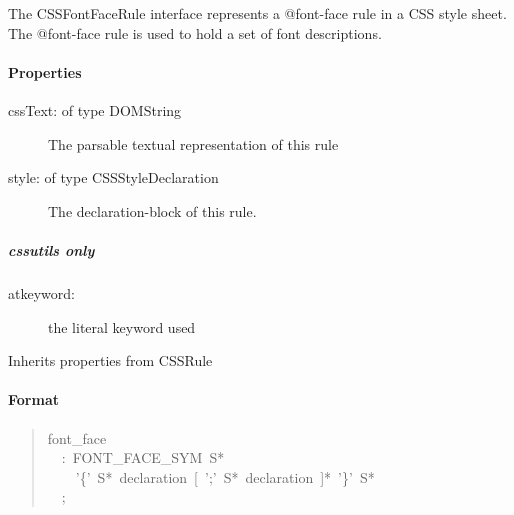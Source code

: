 The CSSFontFaceRule interface represents a @font-face rule in a CSS
style sheet. The @font-face rule is used to hold a set of font
descriptions.



\hypertarget{properties}{}
\paragraph*{Properties}
\label{properties}
\begin{description}
\item[{cssText: of type DOMString}] \leavevmode 
The parsable textual representation of this rule

\item[{style: of type CSSStyleDeclaration}] \leavevmode 
The declaration-block of this rule.

\end{description}



\hypertarget{cssutils-only}{}
\subparagraph*{cssutils only}
\label{cssutils-only}
\begin{description}
\item[{atkeyword:}] \leavevmode 
the literal keyword used

\end{description}

Inherits properties from CSSRule



\hypertarget{format}{}
\paragraph*{Format}
\label{format}
\begin{quote}{\ttfamily \raggedright \noindent
font{\_}face~\\
~~:~FONT{\_}FACE{\_}SYM~S*~\\
~~~~'{\{}'~S*~declaration~{[}~';'~S*~declaration~{]}*~'{\}}'~S*~\\
~~;
}\end{quote}


